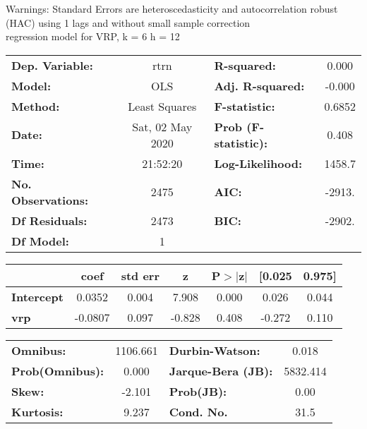 Warnings: \newline
 [1] Standard Errors are heteroscedasticity and autocorrelation robust (HAC) using 1 lags and without small sample correction\\ 

regression model for VRP, k = 6 h = 12\begin{center}
\begin{tabular}{lclc}
\toprule
\textbf{Dep. Variable:}    &       rtrn       & \textbf{  R-squared:         } &     0.000   \\
\textbf{Model:}            &       OLS        & \textbf{  Adj. R-squared:    } &    -0.000   \\
\textbf{Method:}           &  Least Squares   & \textbf{  F-statistic:       } &    0.6852   \\
\textbf{Date:}             & Sat, 02 May 2020 & \textbf{  Prob (F-statistic):} &    0.408    \\
\textbf{Time:}             &     21:52:20     & \textbf{  Log-Likelihood:    } &    1458.7   \\
\textbf{No. Observations:} &        2475      & \textbf{  AIC:               } &    -2913.   \\
\textbf{Df Residuals:}     &        2473      & \textbf{  BIC:               } &    -2902.   \\
\textbf{Df Model:}         &           1      & \textbf{                     } &             \\
\bottomrule
\end{tabular}
\begin{tabular}{lcccccc}
                   & \textbf{coef} & \textbf{std err} & \textbf{z} & \textbf{P$> |$z$|$} & \textbf{[0.025} & \textbf{0.975]}  \\
\midrule
\textbf{Intercept} &       0.0352  &        0.004     &     7.908  &         0.000        &        0.026    &        0.044     \\
\textbf{vrp}       &      -0.0807  &        0.097     &    -0.828  &         0.408        &       -0.272    &        0.110     \\
\bottomrule
\end{tabular}
\begin{tabular}{lclc}
\textbf{Omnibus:}       & 1106.661 & \textbf{  Durbin-Watson:     } &    0.018  \\
\textbf{Prob(Omnibus):} &   0.000  & \textbf{  Jarque-Bera (JB):  } & 5832.414  \\
\textbf{Skew:}          &  -2.101  & \textbf{  Prob(JB):          } &     0.00  \\
\textbf{Kurtosis:}      &   9.237  & \textbf{  Cond. No.          } &     31.5  \\
\bottomrule
\end{tabular}
\end{center}

